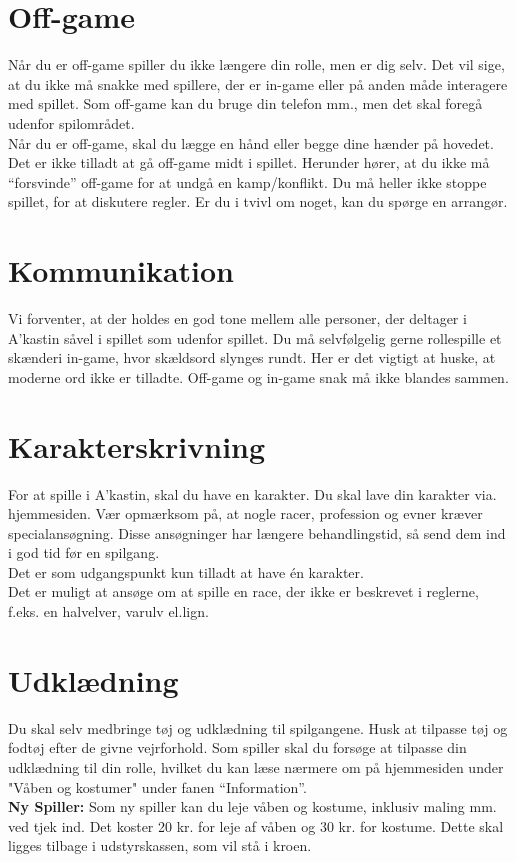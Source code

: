 \section{Off-game}
Når du er off-game spiller du ikke længere din rolle, men er dig selv. Det vil sige, at du ikke må snakke med spillere, der er in-game eller på anden måde interagere med spillet. Som off-game kan du bruge din telefon mm., men det skal foregå udenfor spilområdet.\\
Når du er off-game, skal du lægge en hånd eller begge dine hænder på hovedet. Det er ikke tilladt at gå off-game midt i spillet. Herunder hører, at du ikke må “forsvinde” off-game for at undgå en kamp/konflikt. Du må heller ikke stoppe spillet, for at diskutere regler. Er du i tvivl om noget, kan du spørge en arrangør.

\section{Kommunikation}
Vi forventer, at der holdes en god tone mellem alle personer, der deltager i A’kastin såvel i spillet som udenfor spillet. Du må selvfølgelig gerne rollespille et skænderi in-game, hvor skældsord slynges rundt. Her er det vigtigt at huske, at moderne ord ikke er tilladte. Off-game og in-game snak må ikke blandes sammen.
\section{Karakterskrivning}
For at spille i A’kastin, skal du have en karakter. Du skal lave din karakter via. hjemmesiden. Vær opmærksom på, at nogle racer, profession og evner kræver specialansøgning. Disse ansøgninger har længere behandlingstid, så send dem ind i god tid før en spilgang.\\
Det er som udgangspunkt kun tilladt at have én karakter.\\

Det er muligt at ansøge om at spille en race, der ikke er beskrevet i reglerne, f.eks. en halvelver, varulv el.lign.\\

\section{Udklædning}
Du skal selv medbringe tøj og udklædning til spilgangene. Husk at tilpasse tøj og fodtøj efter de givne vejrforhold. Som spiller skal du forsøge at tilpasse din udklædning til din rolle, hvilket du kan læse nærmere om på hjemmesiden under  "Våben og kostumer" under fanen “Information”.\\
\textbf{Ny Spiller:} Som ny spiller kan du leje våben og kostume, inklusiv maling mm. ved tjek ind. Det koster 20 kr. for leje af våben og 30 kr. for kostume. Dette skal ligges tilbage i udstyrskassen, som vil stå i kroen.
